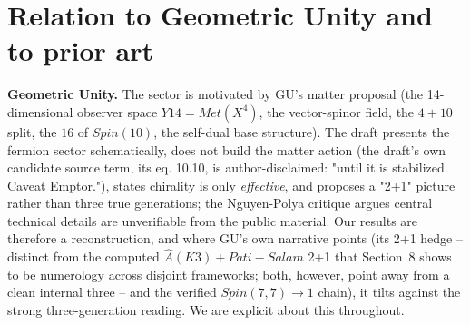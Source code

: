 \documentclass[11pt]{article}
\theoremstyle{remark}
\begin{document}
\section{Relation to Geometric Unity and to prior art}
\textbf{Geometric Unity.} The sector is motivated by GU's matter proposal (the 14-dimensional observer space $Y14 = Met(X^4)$, the vector-spinor field, the $4+10$ split, the $16$ of $Spin(10)$, the self-dual base structure). The draft presents the fermion sector schematically, does not build the matter action (the draft's own candidate source term, its eq. 10.10, is author-disclaimed: "until it is stabilized. Caveat Emptor."), states chirality is only \emph{effective}, and proposes a "2+1" picture rather than three true generations; the Nguyen-Polya critique argues central technical details are unverifiable from the public material. Our results are therefore a reconstruction, and where GU's own narrative points (its 2+1 hedge -- distinct from the computed $\widehat{A}(K3) + Pati-Salam$ 2+1 that Section~8 shows to be numerology across disjoint frameworks; both, however, point away from a clean internal three -- and the verified $Spin(7,7) \to 1$ chain), it tilts against the strong three-generation reading. We are explicit about this throughout.
\end{document}
